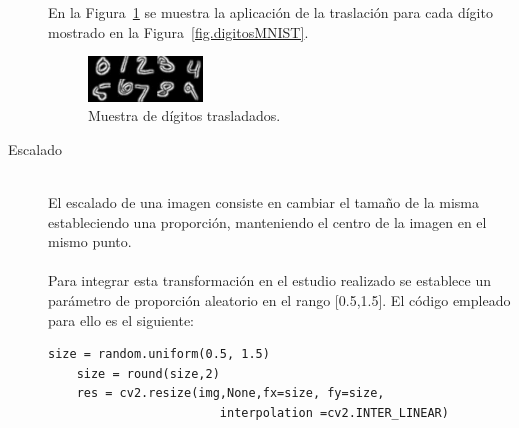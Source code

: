\begin{description}
	En la Figura~\ref{fig.traslacion} se muestra la aplicación de la traslación para cada dígito mostrado en la Figura~\ref{fig.digitosMNIST}.
	\begin{figure}[H]
		\begin{center}
			\includegraphics[width=0.3\textwidth]{figures/traslacion}
			\caption{Muestra de dígitos trasladados.}
			\label{fig.traslacion}
		\end{center}
	\end{figure}
	\vspace{-10pt}
	\item[Escalado] \hfill 
	\vspace{5pt}
	\\
	El escalado de una imagen consiste en cambiar el tamaño de la misma estableciendo una proporción, manteniendo el centro de la imagen en el mismo punto.\\
	\vspace{-10pt}
	\\
	Para integrar esta transformación en el estudio realizado se establece un parámetro de proporción aleatorio en el rango [0.5,1.5]. El código empleado para ello es el siguiente:
	\vspace{10pt}
	\begin{lstlisting}[frame=single]
	size = random.uniform(0.5, 1.5)
	size = round(size,2)
	res = cv2.resize(img,None,fx=size, fy=size, 
						interpolation =cv2.INTER_LINEAR)
	\end{lstlisting}
	

\end{description}
